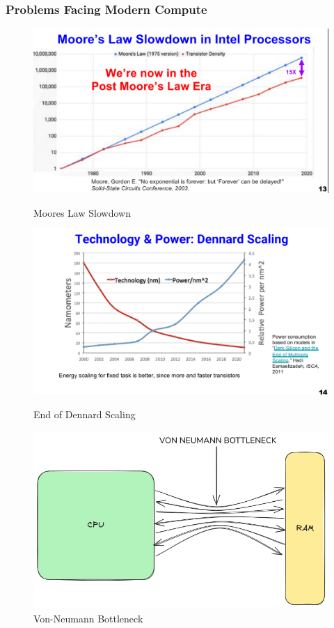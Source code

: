 \documentclass{beamer}
\begin{document}
{\begin{frame}[fragile]
\frametitle{Problems Facing Modern Compute}
  \begin{figure}
    \centering
    \begin{minipage}[b]{0.4\textwidth}
        \centering
        \includegraphics[width=\textwidth]{images/mooreslaw.png}
        \caption{Moores Law Slowdown}
    \end{minipage}
    \hfill
    \begin{minipage}[b]{0.4\textwidth}
        \centering
        \includegraphics[width=\textwidth]{images/dennardscaling.png}
        \caption{End of Dennard Scaling}
    \end{minipage}
    \hfill
    \begin{minipage}[b]{0.5\textwidth}
        \centering
        \includegraphics[width=\textwidth]{images/vonneumann.png}
        \caption{Von-Neumann Bottleneck}
    \end{minipage}
\end{figure}
\end{frame}

}
\end{document}
